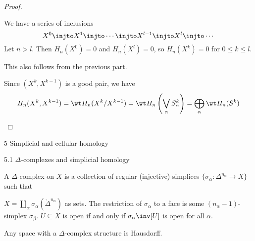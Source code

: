 \begin{proof}
  \lv
  \begin{enum}
    \io
    We have a series of inclusions
    \[ X^0 \injto X^1 \injto \cdots \injto X^{l-1} \injto X^l \injto \cdots \]
    Let $n>l$.
    Then $H_n(X^0)=0$ and $H_n(X^l)=0$, so $H_n(X^k)=0$ for $0 \leq k \leq l$.

    \io
    This also follows from the previous part.

    \io
    Since $(X^k,X^{k-1})$ is a good pair, we have
    \[ H_n(X^k,X^{k-1}) = \wt H_n(X^k/X^{k-1}) = \wt H_n \left( \bigvee_\alpha S_\alpha^k \right) = \bigoplus_\alpha \wt H_n(S^k) \qedhere \]
  \end{enum}
\end{proof}

5 Simplicial and cellular homology

5.1 $\Delta$-complexes and simplicial homology

\begin{defn}
  A $\Delta$-complex on $X$ is a collection of regular (injective) simplices $\{ \sigma_\alpha: \Delta^{n_\alpha} \to X\}$ such that
  \begin{enum}
    \io $X = \coprod_\alpha \sigma_\alpha( \mathring{\Delta}^{n_\alpha} )$ as sets.
    \io The restriction of $\sigma_\alpha$ to a face is some $(n_\alpha-1)$-simplex $\sigma_\beta$.
    \io $U \subseteq X$ is open if and only if $\sigma_\alpha\inv[U]$ is open for all $\alpha$.
  \end{enum}
\end{defn}

\begin{rmk}
  Any space with a $\Delta$-complex structure is Hausdorff.
\end{rmk}
